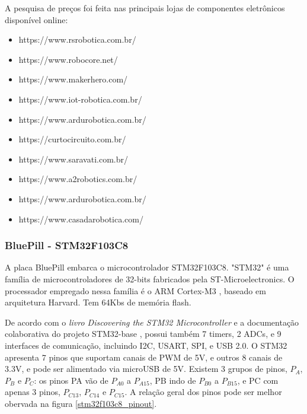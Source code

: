 A pesquisa de preços foi feita nas principais lojas de componentes eletrônicos disponível online:
\begin{itemize}
	\item https://www.rsrobotica.com.br/
	\item https://www.robocore.net/
	\item https://www.makerhero.com/
	\item https://www.iot-robotica.com.br/
	\item https://www.ardurobotica.com.br/
	\item https://curtocircuito.com.br/
	\item https://www.saravati.com.br/
	\item https://www.a2robotics.com.br/
	\item https://www.ardurobotica.com.br/
	\item https://www.casadarobotica.com/
\end{itemize}



\subsubsection{BluePill - STM32F103C8}

A placa BluePill embarca o microcontrolador STM32F103C8.
"STM32" é uma família de microcontroladores de 32-bits fabricados pela
ST-Microelectronics. O processador empregado nessa família é o ARM Cortex-M3 \cite{cortex_m3},
baseado em arquitetura Harvard. Tem 64Kbs de memória flash.

De acordo com o \textit{livro Discovering the STM32 Microcontroller} \cite{stm_doc} e 
a documentação colaborativa \cite{stm32_base_org} do projeto STM32-base \cite{stm32_base},
possui também 7 timers, 2 ADCs, e 9 interfaces de comunicação, incluindo I2C,  USART, SPI, e USB 2.0. 
O STM32 apresenta 7 pinos que suportam canais de PWM de 5V, e outros 8 canais de 3.3V, e pode ser alimentado
via microUSB de 5V. Existem 3 grupos de pinos,  $P_{A}$,  $P_{B}$ e  $P_{C}$: os pinos PA vão de $P_{A0}$ 
a $P_{A15}$, PB indo de $P_{B0}$ a $P_{B15}$, e PC com apenas 3 pinos, $P_{C13}$, $P_{C14}$ e $P_{C15}$.
A relação geral dos pinos pode ser melhor obervada na figura \ref{stm32f103c8_pinout}.

